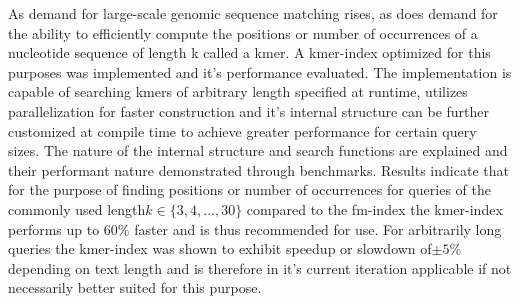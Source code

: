 \author{Clemens~Cords}
\newcommand{\matrikelno}{4872639}
\newcommand{\email}{clemens.cords@fu-berlin.de}

\newcommand{\supervisor}{Prof. Dr. Knut Reinert}
\newcommand{\supervisorUniversity}{Freie Universit\"at Berlin}
\newcommand{\supervisorDepartment}{Dept. of Computer Science and Mathematics}
\newcommand{\supervisorAG}{Algorithmische Bioinformatik}
\newcommand{\supervisorCountry}{Germany}

\newcommand{\fstAdvisor}{Enrico Seiler}
\newcommand{\fstAdvisorsUniversity}{Freie Universit\"at Berlin}
\newcommand{\fstAdvisorsDepartment}{Dept. of Computer Science and Mathematics}
\newcommand{\fstAdvisorsAG}{Algorithmische Bioinformatik}
\newcommand{\fstAdvisorsCountry}{Germany}

\newcommand{\sndAdvisor}{Prof. Dr. Knut Reinert}
\newcommand{\sndAdvisorsUniversity}{Freie Universit\"at Berlin} %
\newcommand{\sndAdvisorsCountry}{Germany}



\begin{abstractEN}
As demand for large-scale genomic sequence matching rises, as does
demand for the ability to efficiently compute the positions or number of occurrences
of a nucleotide sequence of length k called a kmer. A kmer-index optimized for this
purposes was implemented and it's performance evaluated. The implementation
is capable of searching kmers of arbitrary length specified at runtime,
utilizes parallelization for faster construction and it's internal
structure can be further customized at compile time to achieve greater
performance for certain query sizes. The nature of the internal structure
and search functions are explained and their performant nature demonstrated
through benchmarks. Results indicate that for the purpose of finding
positions or number of occurrences for queries of the commonly used
length$k\in\{3,4,...,30\}$ compared to the fm-index the kmer-index
performs up to 60\% faster and is thus recommended for use. For arbitrarily
long queries the kmer-index was shown to exhibit speedup or slowdown
of$\pm5$\% depending on text length and is therefore in it's current
iteration applicable if not necessarily better suited for this purpose.
\end{abstractEN}
\vfill

